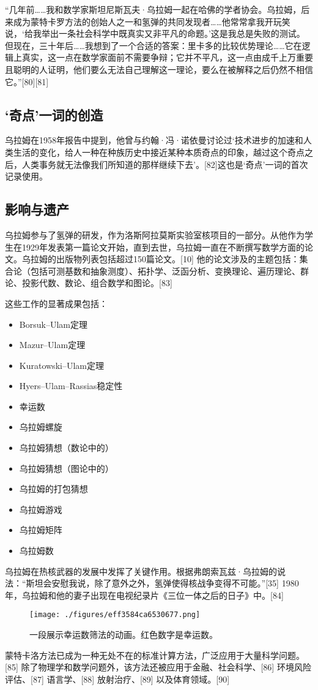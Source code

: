 “几年前……我和数学家斯坦尼斯瓦夫·乌拉姆一起在哈佛的学者协会。乌拉姆，后来成为蒙特卡罗方法的创始人之一和氢弹的共同发现者……他常常拿我开玩笑说，‘给我举出一条社会科学中既真实又非平凡的命题。’这是我总是失败的测试。但现在，三十年后……我想到了一个合适的答案：里卡多的比较优势理论……它在逻辑上真实，这一点在数学家面前不需要争辩；它并不平凡，这一点由成千上万重要且聪明的人证明，他们要么无法自己理解这一理论，要么在被解释之后仍然不相信它。”[80][81]
\subsection{‘奇点’一词的创造}  
乌拉姆在1958年报告中提到，他曾与约翰·冯·诺依曼讨论过‘技术进步的加速和人类生活的变化，给人一种在种族历史中接近某种本质奇点的印象，越过这个奇点之后，人类事务就无法像我们所知道的那样继续下去’。[82]这也是‘奇点’一词的首次记录使用。
\subsection{影响与遗产}  
乌拉姆参与了氢弹的研发，作为洛斯阿拉莫斯实验室核项目的一部分。从他作为学生在1929年发表第一篇论文开始，直到去世，乌拉姆一直在不断撰写数学方面的论文。乌拉姆的出版物列表包括超过150篇论文。[10] 他的论文涉及的主题包括：集合论（包括可测基数和抽象测度）、拓扑学、泛函分析、变换理论、遍历理论、群论、投影代数、数论、组合数学和图论。[83]

这些工作的显著成果包括：
\begin{itemize}
\item Borsuk–Ulam定理  
\item Mazur–Ulam定理  
\item Kuratowski–Ulam定理  
\item Hyers–Ulam–Rassias稳定性  
\item 幸运数  
\item 乌拉姆螺旋  
\item 乌拉姆猜想（数论中的）  
\item 乌拉姆猜想（图论中的）  
\item 乌拉姆的打包猜想  
\item 乌拉姆游戏  
\item 乌拉姆矩阵  
\item 乌拉姆数
\end{itemize}
乌拉姆在热核武器的发展中发挥了关键作用。根据弗朗索瓦兹·乌拉姆的说法：“斯坦会安慰我说，除了意外之外，氢弹使得核战争变得不可能。”[35] 1980年，乌拉姆和他的妻子出现在电视纪录片《三位一体之后的日子》中。[84]
\begin{figure}[ht]
\centering
\texttt{[image: ./figures/eff3584ca6530677.png]}
\caption{一段展示幸运数筛法的动画。红色数字是幸运数。} \label{fig_Ulam_9}
\end{figure}
蒙特卡洛方法已成为一种无处不在的标准计算方法，广泛应用于大量科学问题。[85] 除了物理学和数学问题外，该方法还被应用于金融、社会科学、[86] 环境风险评估、[87] 语言学、[88] 放射治疗、[89] 以及体育领域。[90]


